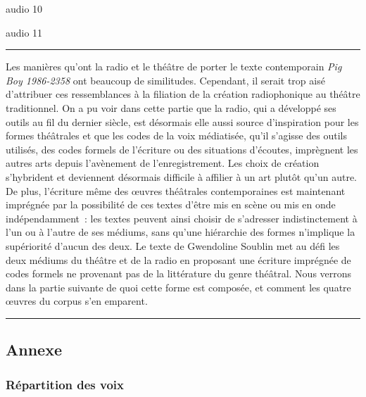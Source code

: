 \documentclass[
]{article}
\begin{document}
audio 10

\label{audio-10}

audio 11

\label{audio-11}

\begin{center}\rule{0.5\linewidth}{0.5pt}\end{center}

Les manières qu'ont la radio et le théâtre de porter le texte contemporain \emph{Pig Boy 1986-2358} ont beaucoup de similitudes. Cependant, il serait trop aisé d'attribuer ces ressemblances à la filiation de la création radiophonique au théâtre traditionnel. On a pu voir dans cette partie que la radio, qui a développé ses outils au fil du dernier siècle, est désormais elle aussi source d'inspiration pour les formes théâtrales et que les codes de la voix médiatisée, qu'il s'agisse des outils utilisés, des codes formels de l'écriture ou des situations d'écoutes, imprègnent les autres arts depuis l'avènement de l'enregistrement. Les choix de création s'hybrident et deviennent désormais difficile à affilier à un art plutôt qu'un autre. De plus, l'écriture même des œuvres théâtrales contemporaines est maintenant imprégnée par la possibilité de ces textes d'être mis en scène ou mis en onde indépendamment~: les textes peuvent ainsi choisir de s'adresser indistinctement à l'un ou à l'autre de ses médiums, sans qu'une hiérarchie des formes n'implique la supériorité d'aucun des deux. Le texte de Gwendoline Soublin met au défi les deux médiums du théâtre et de la radio en proposant une écriture imprégnée de codes formels ne provenant pas de la littérature du genre théâtral. Nous verrons dans la partie suivante de quoi cette forme est composée, et comment les quatre œuvres du corpus s'en emparent.

\begin{center}\rule{0.5\linewidth}{0.5pt}\end{center}

\subsection*{Annexe}\label{annexe}

\subsubsection*{Répartition des voix}\label{ruxe9partition-des-voix}
\end{document}
